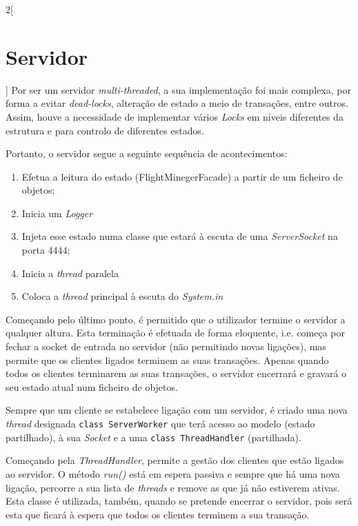 \documentclass[a4paper,11pt]{scrreprt}
\begin{document}
\begin{multicols}{2}[\section{Servidor}]
    Por ser um servidor \textit{multi-threaded}, a sua implementação foi
    mais complexa, por forma a evitar \textit{dead-locks}, alteração de estado
    a meio de transações, entre outros.
    Assim, houve a necessidade de implementar vários \textit{Locks} em níveis
    diferentes da estrutura e para controlo de diferentes estados.
    
    Portanto, o servidor segue a seguinte sequência de acontecimentos:
    \begin{enumerate}
        \item Efetua a leitura do estado (FlightMinegerFacade) a partir de um ficheiro de objetos;
        \item Inicia um \textit{Logger}
        \item Injeta esse estado numa classe que estará à escuta de uma \textit{ServerSocket} na porta $4444$;
        \item Inicia a \textit{thread} paralela
        \item Coloca a \textit{thread} principal à escuta do \textit{System.in}
    \end{enumerate}
    Começando pelo último ponto, é permitido que o utilizador termine o servidor a qualquer
    altura. Esta terminação é efetuada de forma eloquente, i.e. começa por fechar a socket
    de entrada no servidor (não permitindo novas ligações), mas permite que os clientes ligados terminem as suas transações.
    Apenas quando todos os clientes terminarem as suas transações, o servidor encerrará e gravará 
    o seu estado atual num ficheiro de objetos.
    
    Sempre que um cliente se estabelece ligação com um servidor, é criado uma
    nova \textit{thread} designada \texttt{class ServerWorker}
    que terá acesso ao modelo (estado partilhado), à sua \textit{Socket}
    e a uma \texttt{class ThreadHandler} (partilhada).
    
    Começando pela \textit{ThreadHandler}, permite a gestão dos clientes que estão
    ligados ao servidor.
    O método \textit{run()} está em espera passiva e sempre que há uma nova ligação,
    percorre a sua lista de \textit{threads} e remove as que já não estiverem ativas.
    Esta classe é utilizada, também, quando se pretende encerrar o servidor, pois será
    esta que ficará à espera que todos os clientes terminem a sua transação.
    

\end{multicols}
\end{document}
